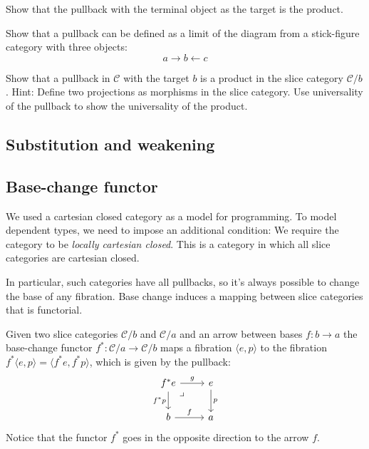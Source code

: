 \documentclass[DaoFP]{subfiles}
\begin{document}
\begin{exercise}
Show that the pullback with the terminal object as the target is the product.
\end{exercise}
\begin{exercise}
Show that a pullback can be defined as a limit of the diagram from a stick-figure category with three objects:
\[ a \rightarrow b \leftarrow c \]
\end{exercise}

\begin{exercise}
Show that a pullback in $\mathcal{C}$ with the target $b$ is a product in the slice category $\mathcal{C}/b$. Hint: Define two projections  as morphisms in the slice category. Use universality of the pullback to show the universality of the product.
\end{exercise}

\subsection{Substitution and weakening}



\subsection{Base-change functor}

We used a cartesian closed category as a model for programming. To model dependent types, we need to impose an additional condition: We require the category to be \emph{locally cartesian closed}. This is a category in which all slice categories are cartesian closed. 

In particular, such categories have all pullbacks, so it's always possible to change the base of any fibration.  Base change induces a mapping between slice categories that is functorial. 

Given two slice categories $\mathcal{C}/b$ and $\mathcal{C}/a$ and an arrow between bases $f \colon b \to a$ the base-change functor $f^* \colon \mathcal{C}/a \to \mathcal{C}/b$ maps a fibration $\langle e, p \rangle$ to the fibration $ f^* \langle e, p \rangle= \langle f^* e, f^* p \rangle$, which is given by the pullback:
\[
 \begin{tikzcd}
f^* e
\arrow[dr, phantom,  , very near start, "\lrcorner"]
 \arrow[d, "f^*p"']
 \arrow[r, "g"]
 & e
 \arrow[d, "p"]
 \\
 b
 \arrow[r, "f"]
 &a
  \end{tikzcd}
\]
Notice that the functor $f^*$ goes in the opposite direction to the arrow $f$.
\end{document}
